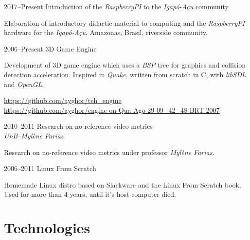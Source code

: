\documentclass[a4paper,twoside]{simplecv}
\begin{document}
\begin{topic}
%
%
%
\item[2017--Present] Introduction of the \emph{RaspberryPI} to the \emph{Igapó-Açu} community

	Elaboration of introductory didactic material to computing and the
	\emph{RaspberryPI} hardware for the \emph{Igapó-Açu}, Amazonas, Brasil,
	riverside community.

\item[2006--Present] 3D Game Engine

	Development of 3D game engine which uses a \emph{BSP} tree for graphics
	and collision detection acceleration. Inspired in \emph{Quake}, written
	from scratch in C, with \emph{libSDL} and \emph{OpenGL}.

	{\scriptsize\url{https://github.com/ayghor/teh_engine}}\\
	{\scriptsize\url{https://github.com/ayghor/engine-on-Qua-Ago-29-09\_42\_48-BRT-2007}}

\item[2010--2011] Research on no-reference video metrics\\
	{\em\small UnB--Mylène Farias}

	Research on no-reference video metrics under professor \emph{Mylène
	Farias}.

\item[2006--2011] Linux From Scratch

	Homemade Linux distro based on Slackware and the Linux From Scratch
	book. Used for more than 4 years, until it's host computer died.

\end{topic}

\section{Technologies}
\end{document}

